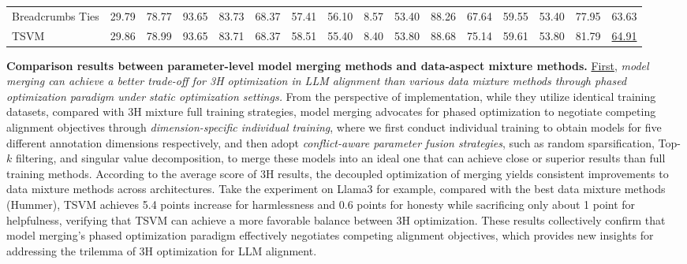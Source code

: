 \begin{table*}
{\begin{tabular}{lcccccccc|c|cc|cccc}
            Breadcrumbs Ties                  & 29.79                                     & 78.77            & 93.65                                      & 83.73                                  & 68.37                                 & 57.41                                   & 56.10                         & 8.57     & 53.40           & 88.26           & 67.64       & 59.55 & 53.40 & 77.95 & 63.63             \\
            TSVM                              & 29.86                                     & 78.99            & 93.65                                      & 83.71                                  & 68.37                                 & 58.51                                   & 55.40                         & 8.40     & 53.80           & 88.68           & 75.14       & 59.61 & 53.80 & 81.79 & \underline{64.91} \\
            \bottomrule
        \end{tabular}
    }
\end{table*}
\textbf{Comparison results between parameter-level model merging methods and data-aspect mixture methods.}
\underline{First}, \textit{model merging can achieve a better trade-off for 3H optimization in LLM alignment than various data mixture methods through phased optimization paradigm under static optimization settings.} From the perspective of implementation, while they utilize identical training datasets, compared with 3H mixture full training strategies, model merging advocates for phased optimization to negotiate competing alignment objectives through \textit{dimension-specific individual training}, where we first conduct individual training to obtain models for five different annotation dimensions respectively, and then adopt \textit{conflict-aware parameter fusion strategies}, such as random sparsification, Top-$k$ filtering, and singular value decomposition, to merge these models into an ideal one that can achieve close or superior results than full training methods. According to the average score of 3H results, the decoupled optimization of merging yields consistent improvements to data mixture methods across architectures. Take the experiment on Llama3 for example, compared with the best data mixture methods (Hummer), TSVM achieves 5.4 points increase for harmlessness and 0.6 points for honesty while sacrificing only about 1 point for helpfulness, verifying that TSVM can achieve a more favorable balance between 3H optimization. These results collectively confirm that model merging's phased optimization paradigm effectively negotiates competing alignment objectives, which provides new insights for addressing the trilemma of 3H optimization for LLM alignment.

